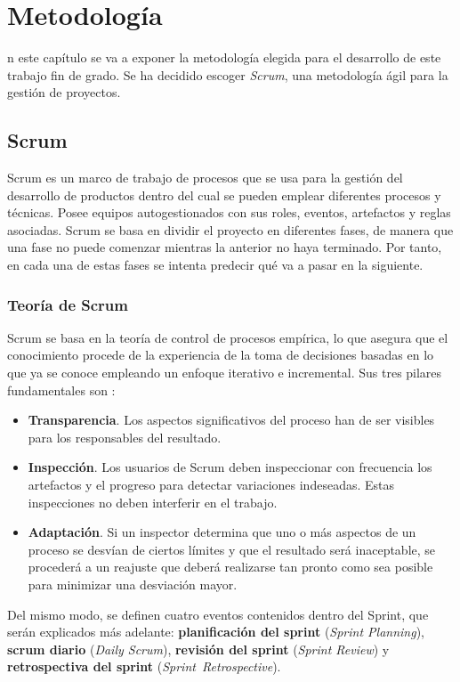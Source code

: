 \chapter{Metodología}
\label{chap:metodologia}

n este capítulo se va a exponer la metodología elegida para el desarrollo de este trabajo fin de grado. Se ha decidido escoger \textit{Scrum}, una metodología ágil para la gestión de proyectos.

\section{Scrum}
Scrum \cite{Schwaber2017} es un marco de trabajo de procesos que se usa para la gestión del desarrollo de productos dentro del cual se pueden emplear diferentes procesos y técnicas. Posee equipos autogestionados con sus roles, eventos, artefactos y reglas asociadas. Scrum se basa en dividir el proyecto en diferentes fases, de manera que una fase no puede comenzar mientras la anterior no haya terminado. Por tanto, en cada una de estas fases se intenta predecir qué va a pasar en la siguiente.

\subsection{Teoría de Scrum}
Scrum se basa en la teoría de control de procesos empírica, lo que asegura que el conocimiento procede de la experiencia de la toma de decisiones basadas en lo que ya se conoce empleando un enfoque iterativo e incremental. Sus tres pilares fundamentales son \cite{Schwaber2017}:

\begin{itemize}
	\item \textbf{Transparencia}. Los aspectos significativos del proceso han de ser visibles para los responsables del resultado.
	\item \textbf{Inspección}. Los usuarios de Scrum deben inspeccionar con frecuencia los artefactos y el progreso para detectar variaciones indeseadas. Estas inspecciones no deben interferir en el trabajo.
	\item \textbf{Adaptación}. Si un inspector determina que uno o más aspectos de un proceso se desvían de ciertos límites y que el resultado será inaceptable, se procederá a un reajuste que deberá realizarse tan pronto como sea posible para minimizar una desviación mayor.
\end{itemize}

Del mismo modo, se definen cuatro eventos contenidos dentro del Sprint, que serán explicados más adelante: \textbf{planificación del sprint} (\textit{Sprint Planning}), \textbf{scrum diario} (\textit{Daily Scrum}), \textbf{revisión del sprint} (\textit{Sprint Review}) y \textbf{retrospectiva del sprint} (\textit{\mbox{Sprint Retrospective}}).

